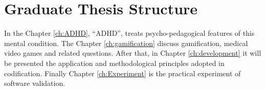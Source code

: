 \section{Graduate Thesis Structure}
\label{sc:structure}

In the Chapter \ref{ch:ADHD}, ``ADHD'', treats  psycho-pedagogical features of this mental condition. The Chapter \ref{ch:gamification} discuss gamification, medical video games and related questions. After that, in Chapter \ref{ch:development} it will be presented the application  and methodological principles adopted in codification. Finally Chapter \ref{ch:Experiment}  is the practical experiment of software validation.